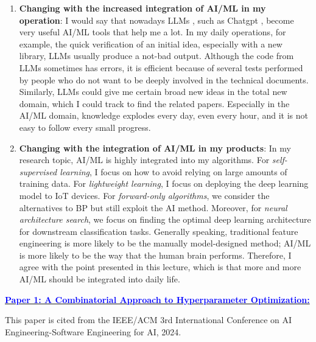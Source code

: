 \documentclass[11pt]{article}
\newcommand{\statement}[1]{\par\medskip
  \underline{\textcolor{blue}{\textbf{#1:}}}\space
}
\begin{document}
\begin{enumerate}
  \item \textbf{Changing with the increased integration of AI/ML in my operation}: I would say that nowadays LLMs \cite{NEURIPS2020_1457c0d6,touvron2023llama,anil2023palm}, such as Chatgpt \cite{achiam2023gpt}, become very useful AI/ML tools that help me a lot. In my daily operations, for example, the quick verification of an initial idea, especially with a new library, LLMs usually produce a not-bad output. Although the code from LLMs sometimes has errors, it is efficient because of several tests performed by people who do not want to be deeply involved in the technical documents. Similarly, LLMs could give me certain broad new ideas in the total new domain, which I could track to find the related papers. Especially in the AI/ML domain, knowledge explodes every day, even every hour, and it is not easy to follow every small progress.

  \item \textbf{Changing with the integration of AI/ML in my products}: In my research topic, AI/ML is highly integrated into my algorithms. For \textit{self-supervised learning}, I focus on how to avoid relying on large amounts of training data. For \textit{lightweight learning}, I focus on deploying the deep learning model to \gls{IoT} devices. For \textit{forward-only algorithms}, we consider the alternatives to \gls{BP} but still exploit the AI method. Moreover, for \textit{neural architecture search}, we focus on finding the optimal deep learning architecture for downstream classification tasks. Generally speaking, traditional feature engineering is more likely to be the manually model-designed method; AI/ML is more likely to be the way that the human brain performs. Therefore, I agree with the point presented in this lecture, which is that more and more AI/ML should be integrated into daily life.
\end{enumerate}


\statement{Paper 1: A Combinatorial Approach to Hyperparameter Optimization} 

This paper \cite{khadka2024combinatorial} is cited from the IEEE/ACM 3rd International Conference on AI Engineering-Software Engineering for AI, 2024.
\end{document}
